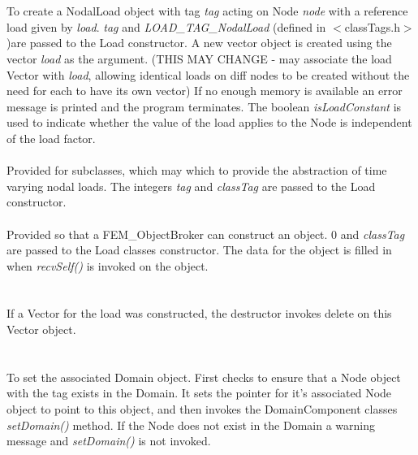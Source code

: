   \\
  \\
To create a NodalLoad object with tag {\em tag} acting on Node {\em node} with a
reference load given by {\em load}. {\em tag} and {\em LOAD\_TAG\_NodalLoad} (defined in
$<$classTags.h$>$)are passed to the Load constructor.  A new vector object is created using
the vector {\em load} as the argument. (THIS MAY CHANGE - may associate
the load Vector with {\em load}, allowing identical loads on diff
nodes to be created without the need for each to have its own
vector) If no enough memory is available an error message is printed
and the program terminates. The boolean {\em isLoadConstant} is used
to indicate whether the value of the load applies to the Node is
independent of the load factor. \\ 

  \\
Provided for subclasses, which may which to provide the abstraction of
time varying nodal loads. The integers {\em tag} and {\em classTag}
are passed to the Load constructor. \\

  \\
Provided so that a FEM\_ObjectBroker can construct an object. $0$ and
{\em classTag} are passed to the Load classes constructor. The data
for the object is filled in when {\em recvSelf()} is invoked on the
object.\\

  \\
 \\ 
If a Vector for the load was constructed, the destructor invokes
delete on this Vector object. \\


  \\
 \\
To set the associated Domain object. First checks to ensure that a
Node object with the tag exists in the Domain. It sets the pointer for
it's associated Node object to point to this object, and then 
invokes the DomainComponent classes {\em setDomain()} method. If the
Node does not exist in the Domain a warning message and {\em
setDomain()} is not invoked. \\

